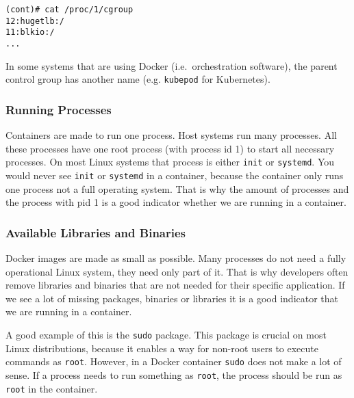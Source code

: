 \begin{lstlisting}[caption={Process control groups on host},captionpos=b]
(cont)# cat /proc/1/cgroup
12:hugetlb:/
11:blkio:/
...
\end{lstlisting}

\hfill

In some systems that are using Docker (i.e.\ orchestration software), the parent control group has another name (e.g. \lstinline{kubepod} for Kubernetes).

\subsubsection{Running Processes}
Containers are made to run one process. Host systems run many processes. All these processes have one root process (with process id 1) to start all necessary processes. On most Linux systems that process is either \lstinline{init} or \lstinline{systemd}. You would never see \lstinline{init} or \lstinline{systemd} in a container, because the container only runs one process not a full operating system. That is why the amount of processes and the process with pid 1 is a good indicator whether we are running in a container.

\subsubsection{Available Libraries and Binaries}
Docker images are made as small as possible. Many processes do not need a fully operational Linux system, they need only part of it. That is why developers often remove libraries and binaries that are not needed for their specific application. If we see a lot of missing packages, binaries or libraries it is a good indicator that we are running in a container.

A good example of this is the \lstinline{sudo} package. This package is crucial on most Linux distributions, because it enables a way for non-root users to execute commands as \lstinline{root}. However, in a Docker container \lstinline{sudo} does not make a lot of sense. If a process needs to run something as \lstinline{root}, the process should be run as \lstinline{root} in the container.
